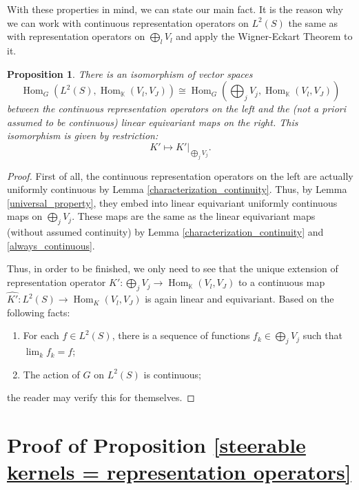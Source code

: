 \documentclass[12pt, a4paper]{article}
\theoremstyle{plain}
\newtheorem{pro}{Proposition}[section]
\theoremstyle{definition}
\theoremstyle{remark}
\newcommand{\K}{\mathds{K}}
\DeclareMathOperator{\Hom}{Hom}
\begin{document}
With these properties in mind, we can state our main fact. It is the reason why we can work with continuous representation operators on $L^2(S)$ the same as with representation operators on $\bigoplus_l V_l$ and apply the Wigner-Eckart Theorem to it.

\begin{pro}\label{ignore_closure}
There is an isomorphism of vector spaces
\begin{equation*}
\Hom_{G}(L^2(S), \Hom_{\K}(V_l, V_J)) \cong \Hom_{G}\left( \bigoplus_{j}V_j, \Hom_{\K}(V_l, V_J) \right)
\end{equation*}
between the \emph{continuous} representation operators on the left and the (not a priori assumed to be continuous) linear equivariant maps on the right. This isomorphism is given by restriction:
\begin{equation*}
K' \mapsto K'|_{\bigoplus_{j} V_j}.
\end{equation*}
\end{pro}

\begin{proof}
First of all, the continuous representation operators on the left are actually uniformly continuous by Lemma \ref{characterization_continuity}. Thus, by Lemma \ref{universal_property}, they embed into linear equivariant uniformly continuous maps on $\bigoplus_j V_j$. These maps are the same as the linear equivariant maps (without assumed continuity) by Lemma \ref{characterization_continuity} and \ref{always_continuous}.

Thus, in order to be finished, we only need to see that the unique extension of representation operator $K': \bigoplus_{j} V_j \to \Hom_{\K}(V_l, V_J)$ to a continuous map $\hat{K'}: L^2(S) \to \Hom_{K}(V_l, V_J)$ is again linear and equivariant. Based on the following facts:
\begin{enumerate}
\item For each $f \in L^2(S)$, there is a sequence of functions $f_k \in \bigoplus_j V_j$ such that $\lim_k f_k = f$;
\item The action of $G$ on $L^2(S)$ is continuous;
\end{enumerate}
the reader may verify this for themselves.
\end{proof}


\section{Proof of Proposition \ref{steerable kernels = representation operators}}\label{proof_of_main}
\end{document}
